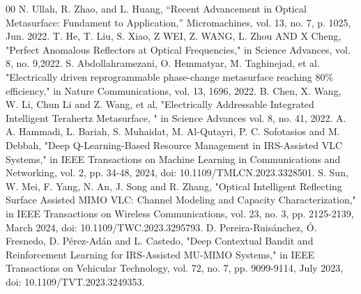 \documentclass[conference]{IEEEtran}
\begin{document}
\begin{thebibliography}{00}
	N. Ullah, R. Zhao, and L. Huang, “Recent Advancement in Optical Metasurface: Fundament to Application,” Micromachines, vol. 13, no. 7, p. 1025, Jun. 2022.
	T. He, T. Liu, S. Xiao, Z WEI, Z. WANG, L. Zhou AND X Cheng, "Perfect Anomalous Reflectors at Optical Frequencies," in Science Advances, vol. 8, no. 9,2022.
	S. Abdollahramezani, O. Hemmatyar, M. Taghinejad, et al. "Electrically driven reprogrammable phase-change metasurface reaching 80\% efficiency," in Nature Communications, vol. 13, 1696, 2022.
	B. Chen, X. Wang, W. Li, Chun Li and Z. Wang, et al, "Electrically Addressable Integrated Intelligent Terahertz Metasurface, " in Science Advances vol. 8, no. 41, 2022.
	A. A. Hammadi, L. Bariah, S. Muhaidat, M. Al-Qutayri, P. C. Sofotasios and M. Debbah, "Deep Q-Learning-Based Resource Management in IRS-Assisted VLC Systems," in IEEE Transactions on Machine Learning in Communications and Networking, vol. 2, pp. 34-48, 2024, doi: 10.1109/TMLCN.2023.3328501. 
	S. Sun, W. Mei, F. Yang, N. An, J. Song and R. Zhang, "Optical Intelligent Reflecting Surface Assisted MIMO VLC: Channel Modeling and Capacity Characterization," in IEEE Transactions on Wireless Communications, vol. 23, no. 3, pp. 2125-2139, March 2024, doi: 10.1109/TWC.2023.3295793.
	D. Pereira-Ruisánchez, Ó. Fresnedo, D. Pérez-Adán and L. Castedo, "Deep Contextual Bandit and Reinforcement Learning for IRS-Assisted MU-MIMO Systems," in IEEE Transactions on Vehicular Technology, vol. 72, no. 7, pp. 9099-9114, July 2023, doi: 10.1109/TVT.2023.3249353.
\end{thebibliography}
\end{document}
